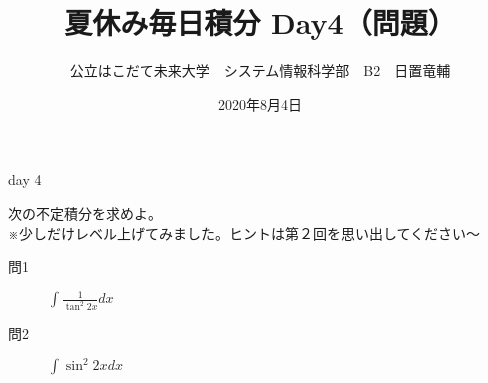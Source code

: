 \documentclass[dvipdfmx,uplatex]{jsarticle}
\title{夏休み毎日積分 Day4（問題）}
\author{公立はこだて未来大学　システム情報科学部　B2　日置竜輔}
\date{2020年8月4日}
\begin{document}
\maketitle

\begin{itembox}[c]{day 4}
    \begin{center}
        次の不定積分を求めよ。\\
        ※少しだけレベル上げてみました。ヒントは第２回を思い出してください〜
    \end{center}
\end{itembox}
\begin{description}
    \item [問1] $ \displaystyle \int \frac{1}{\tan ^ 2{2x}} dx $
\end{description}
\begin{description}
    \item [問2] $ \displaystyle \int \sin ^ 2{2x} dx $
\end{description}
\end{document}
